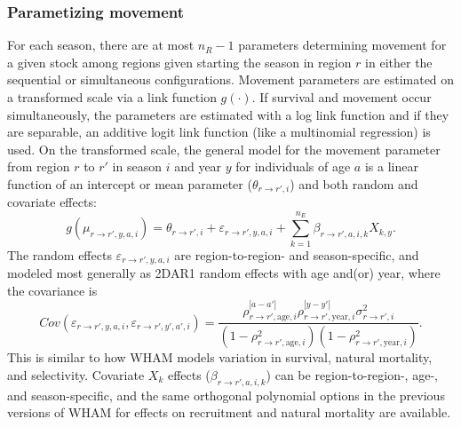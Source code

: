 \documentclass[
]{article}
\begin{document}
\hypertarget{parametizing-movement}{%
\subsubsection*{Parametizing movement}\label{parametizing-movement}}

For each season, there are at most \(n_R-1\) parameters determining movement for a given stock among regions given starting the season in region \(r\) in either the sequential or simultaneous configurations. Movement parameters are estimated on a transformed scale via a link function \(g(\cdot)\). If survival and movement occur simultaneously, the parameters are estimated with a log link function and if they are separable, an additive logit link function (like a multinomial regression) is used. On the transformed scale, the general model for the movement parameter from region \(r\) to \(r'\) in season \(i\) and year \(y\) for individuals of age \(a\) is a linear function of an intercept or mean parameter (\(\theta_{r\rightarrow r',i}\)) and both random and covariate effects:
\begin{equation*}
  g(\mu_{r\rightarrow r',y,a,i}) = \theta_{r\rightarrow r',i} + \varepsilon_{r\rightarrow r',y,a,i} + \sum^{n_E}_{k=1} \beta_{r \rightarrow r',a,i,k} X_{k,y}.
\end{equation*}
The random effects \(\varepsilon_{r\rightarrow r',y,a,i}\) are region-to-region- and season-specific, and modeled most generally as 2DAR1 random effects with age and(or) year, where the covariance is
\begin{equation*}
  Cov\left(\varepsilon_{r\rightarrow r',y,a,i},\varepsilon_{r\rightarrow r',y',a',i}\right) =   \frac{\rho_{r\rightarrow r',\text{age},i}^{|a-a'|}\rho_{r\rightarrow r',\text{year},i}^{|y-y'|}\sigma^2_{r\rightarrow r',i}}{\left(1 -  \rho_{r\rightarrow r',\text{age},i}^2\right)\left(1 - \rho_{r\rightarrow r',\text{year},i}^2\right)}.
\end{equation*}
This is similar to how WHAM models variation in survival, natural mortality, and selectivity. Covariate \(X_k\) effects (\(\beta_{r\rightarrow r',a,i,k}\)) can be region-to-region-, age-, and season-specific, and the same orthogonal polynomial options in the previous versions of WHAM for effects on recruitment and natural mortality are available.
\end{document}
